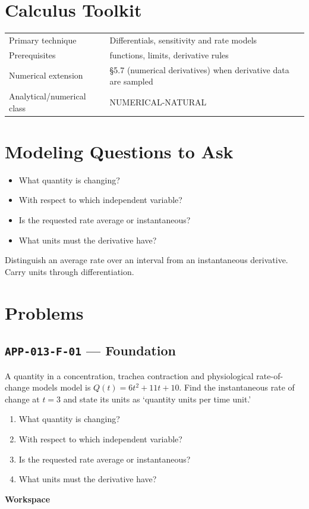 \documentclass[11pt]{book}
\newcommand{\pid}[1]{\texttt{#1}}
\newcommand{\workspace}{\par\vspace{0.7in}\hrulefill\par\vspace{0.55in}\hrulefill\par}
\begin{document}
\section*{Calculus Toolkit}
\begin{tabularx}{\textwidth}{@{}lX@{}}\toprule
Primary technique & Differentials, sensitivity and rate models \\
Prerequisites & functions, limits, derivative rules \\
Numerical extension & §5.7 (numerical derivatives) when derivative data are sampled \\
Analytical/numerical class & NUMERICAL-NATURAL \\
\bottomrule\end{tabularx}
\section*{Modeling Questions to Ask}\begin{itemize}
\item What quantity is changing?
\item With respect to which independent variable?
\item Is the requested rate average or instantaneous?
\item What units must the derivative have?
\end{itemize}
\begin{errorbox}Distinguish an average rate over an interval from an instantaneous derivative. Carry units through differentiation.\end{errorbox}
\section*{Problems}
\subsection*{\pid{APP-013-F-01} — Foundation}
\begin{problembox}
A quantity in a concentration, trachea contraction and physiological rate-of-change models model is $Q(t)=6t^2+11t+10$. Find the instantaneous rate of change at $t=3$ and state its units as ‘quantity units per time unit.’
\end{problembox}
\begin{promptbox}\begin{enumerate}
\item What quantity is changing?
\item With respect to which independent variable?
\item Is the requested rate average or instantaneous?
\item What units must the derivative have?
\end{enumerate}\end{promptbox}
\textbf{Workspace}\workspace
{}
\end{document}
